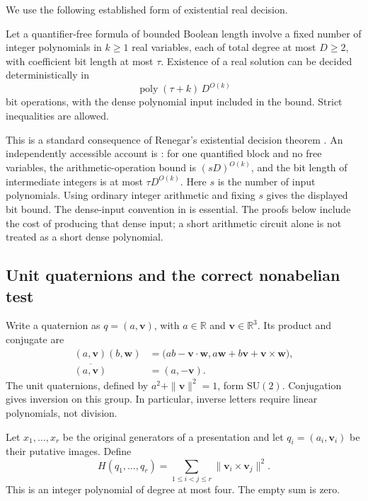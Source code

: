 We use the following established form of existential real decision.

\begin{theorem}
\label{thm:su2-real-decision}
Let a quantifier-free formula of bounded Boolean length involve a fixed number of integer polynomials
in $k\geq 1$ real variables, each of total degree at most $D\geq 2$, with
coefficient bit length at most $\tau$.  Existence of a real solution can be
decided deterministically in
\[
 \operatorname{poly}(\tau+k)\,D^{O(k)}
\]
bit operations, with the dense polynomial input included in the bound.
Strict inequalities are allowed.
\end{theorem}

This is a standard consequence of Renegar's existential decision theorem
\cite{Renegar1992}.  An independently accessible account is
\cite[Theorem~2.18]{BasuSurvey}: for one quantified block and no free
variables, the arithmetic-operation bound is $(sD)^{O(k)}$, and the bit
length of intermediate integers is at most $\tau D^{O(k)}$.  Here $s$ is
the number of input polynomials.  Using ordinary integer arithmetic and
fixing $s$ gives the displayed bit bound.  The dense-input convention in
\cite[Section~2.5]{BasuSurvey} is essential.  The proofs below include the
cost of producing that dense input; a short arithmetic circuit alone is not
treated as a short dense polynomial.

\subsection{Unit quaternions and the correct nonabelian test}

Write a quaternion as $q=(a,\mathbf v)$, with $a\in\mathbb R$ and
$\mathbf v\in\mathbb R^3$.  Its product and conjugate are
\begin{align}
 (a,\mathbf v)(b,\mathbf w)
   &=\bigl(ab-\mathbf v\cdot\mathbf w,
       a\mathbf w+b\mathbf v+\mathbf v\times\mathbf w\bigr),
       \label{eq:su2-product}\\
 \overline{(a,\mathbf v)}&=(a,-\mathbf v).
\end{align}
The unit quaternions, defined by $a^2+\|\mathbf v\|^2=1$, form
$\mathrm{SU}(2)$.  Conjugation gives inversion on this group.  In particular,
inverse letters require linear polynomials, not division.

Let $x_1,\ldots,x_r$ be the original generators of a presentation and let
$q_i=(a_i,\mathbf v_i)$ be their putative images.  Define
\begin{equation}
 H(q_1,\ldots,q_r)
   =\sum_{1\leq i<j\leq r}\|\mathbf v_i\times\mathbf v_j\|^2.
 \label{eq:su2-nonabelian}
\end{equation}
This is an integer polynomial of degree at most four.  The empty sum is zero.

